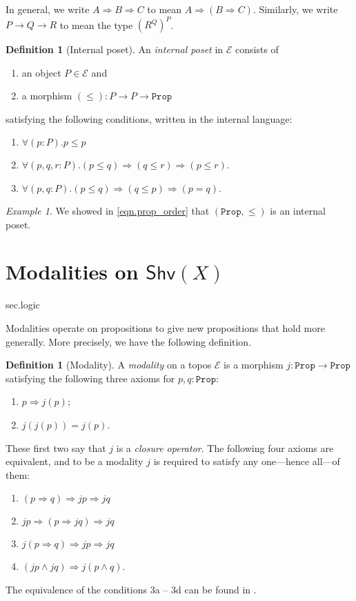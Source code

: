 \documentclass[11pt, oneside, article]{memoir}
\theoremstyle{plain}
\theoremstyle{definition}
\newtheorem{definition}[theorem]{Definition}
\theoremstyle{remark}
\newtheorem{example}[theorem]{Example}
\newcommand{\const}[1]{\mathtt{#1}}
\newcommand{\cat}[1]{\mathcal{#1}}
\newcommand{\Fun}[1]{\mathsf{#1}}
\newcommand{\shv}{\Fun{Shv}}
\newcommand{\prop}{\const{Prop}}
\newcommand{\imp}{\Rightarrow}
\begin{document}
In general, we write $A\imp B\imp C$ to mean $A\imp(B\imp C)$. Similarly, we write $P\to Q\to R$ to mean the type $(R^Q)^P$.

\begin{definition}[Internal poset]\label{def.internal_poset}
An \emph{internal poset} in $\cat{E}$ consists of
\begin{enumerate}
	\item an object $P\in\cat{E}$ and
	\item a morphism $(\leq)\colon P\to P\to\prop$
\end{enumerate}
satisfying the following conditions, written in the internal language:
\begin{enumerate}[label=\alph*.]
	\item $\forall (p:P).p\leq p$
	\item $\forall (p,q,r:P).(p\leq q)\imp (q\leq r)\imp(p\leq r)$.
	\item $\forall (p,q:P).(p\leq q)\imp(q\leq p)\imp (p=q).$
\end{enumerate}
\end{definition}

\begin{example}
We showed in \cref{eqn.prop_order} that $(\prop,\leq)$ is an internal poset.
\end{example}

\section{Modalities on $\shv(X)$}\label{sec.modalities}sec.logic

Modalities operate on propositions to give new propositions that hold more generally. More precisely, we have the following definition. 

\begin{definition}[Modality]\label{def.modality}
A \emph{modality} on a topos $\cat{E}$ is a morphism $j\colon\prop\to\prop$ satisfying the following three axioms for $p,q:\prop$:
\begin{enumerate}
	\item $p\imp j(p)$;
	\item $j(j(p))=j(p)$.
\end{enumerate}
These first two say that $j$ is a \emph{closure operator}. The following four axioms are equivalent, and to be a modality $j$ is required to satisfy any one---hence all---of them:
\begin{enumerate}[label=3\alph*.]
  \item $(p\imp q)\imp jp\imp jq$
  \item $jp\imp(p\imp jq)\imp jq$
  \item $j(p\imp q)\imp jp\imp jq$
  \item $(jp\wedge jq)\imp j(p\wedge q)$.
\end{enumerate}
\end{definition}
The equivalence of the conditions 3a -- 3d can be found in \cite[Lemma 4.6]{schultz2019temporal}.
\end{document}
